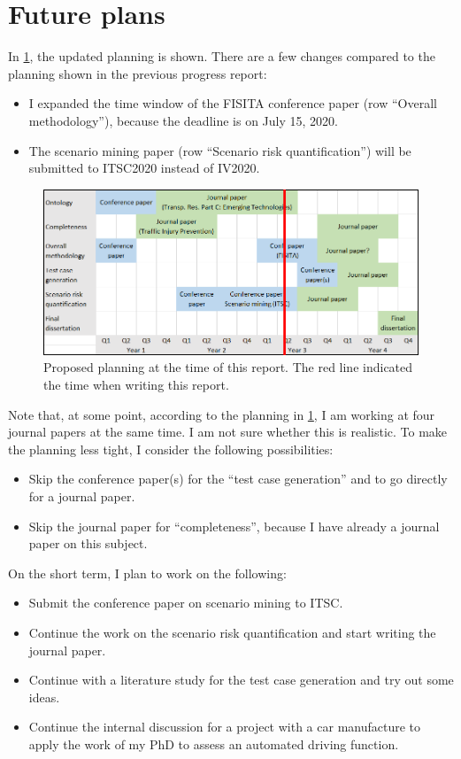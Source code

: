 \documentclass[10pt,final,a4paper,oneside,onecolumn]{article}
\begin{document}
\section{Future plans}

In \cref{fig:planning}, the updated planning is shown. There are a few changes compared to the planning shown in the previous progress report:
\begin{itemize}
	\item I expanded the time window of the FISITA conference paper (row ``Overall methodology''), because the deadline is on July 15, 2020.
	\item The scenario mining paper (row ``Scenario risk quantification'') will be submitted to ITSC2020 instead of IV2020.
\end{itemize}

\begin{figure}[t]
	\centering
	\includegraphics[width=\linewidth]{planning.png}
	\caption{Proposed planning at the time of this report. The red line indicated the time when writing this report.}
	\label{fig:planning}
\end{figure}

Note that, at some point, according to the planning in \cref{fig:planning}, I am working at four journal papers at the same time. I am not sure whether this is realistic. To make the planning less tight, I consider the following possibilities:
\begin{itemize}
	\item Skip the conference paper(s) for the ``test case generation'' and to go directly for a journal paper. 
	\item Skip the journal paper for ``completeness'', because I have already a journal paper on this subject.
\end{itemize}

On the short term, I plan to work on the following:
\begin{itemize}
	\item Submit the conference paper on scenario mining to ITSC.
	\item Continue the work on the scenario risk quantification and start writing the journal paper.
	\item Continue with a literature study for the test case generation and try out some ideas.
	\item Continue the internal discussion for a project with a car manufacture to apply the work of my PhD to assess an automated driving function.
\end{itemize}
\end{document}
